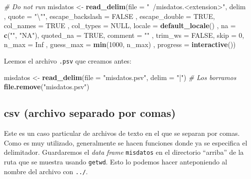 \documentclass[]{article}
\newenvironment{Shaded}{\begin{snugshade}}{\end{snugshade}}
\newcommand{\KeywordTok}[1]{\textcolor[rgb]{0.13,0.29,0.53}{\textbf{#1}}}
\newcommand{\DataTypeTok}[1]{\textcolor[rgb]{0.13,0.29,0.53}{#1}}
\newcommand{\DecValTok}[1]{\textcolor[rgb]{0.00,0.00,0.81}{#1}}
\newcommand{\CharTok}[1]{\textcolor[rgb]{0.31,0.60,0.02}{#1}}
\newcommand{\StringTok}[1]{\textcolor[rgb]{0.31,0.60,0.02}{#1}}
\newcommand{\CommentTok}[1]{\textcolor[rgb]{0.56,0.35,0.01}{\textit{#1}}}
\newcommand{\OtherTok}[1]{\textcolor[rgb]{0.56,0.35,0.01}{#1}}
\newcommand{\NormalTok}[1]{#1}
\begin{document}
\begin{Shaded}
\begin{Highlighting}[]
\CommentTok{# Do not run}
\NormalTok{misdatos <-}\StringTok{ }\KeywordTok{read_delim}\NormalTok{(}\DataTypeTok{file =} \StringTok{"~/misdatos.<extension>"}\NormalTok{, delim}
\NormalTok{                       , }\DataTypeTok{quote =} \StringTok{"}\CharTok{\textbackslash{}"}\StringTok{"}\NormalTok{, }\DataTypeTok{escape_backslash =} \OtherTok{FALSE}
\NormalTok{                       , }\DataTypeTok{escape_double =} \OtherTok{TRUE}\NormalTok{, }\DataTypeTok{col_names =} \OtherTok{TRUE}
\NormalTok{                       , }\DataTypeTok{col_types =} \OtherTok{NULL}\NormalTok{, }\DataTypeTok{locale =} \KeywordTok{default_locale}\NormalTok{()}
\NormalTok{                       , }\DataTypeTok{na =} \KeywordTok{c}\NormalTok{(}\StringTok{""}\NormalTok{, }\StringTok{"NA"}\NormalTok{), }\DataTypeTok{quoted_na =} \OtherTok{TRUE}\NormalTok{, }\DataTypeTok{comment =} \StringTok{""}
\NormalTok{                       , }\DataTypeTok{trim_ws =} \OtherTok{FALSE}\NormalTok{, }\DataTypeTok{skip =} \DecValTok{0}\NormalTok{, }\DataTypeTok{n_max =} \OtherTok{Inf}
\NormalTok{                       , }\DataTypeTok{guess_max =} \KeywordTok{min}\NormalTok{(}\DecValTok{1000}\NormalTok{, n_max)}
\NormalTok{                       , }\DataTypeTok{progress =} \KeywordTok{interactive}\NormalTok{())}
\end{Highlighting}
\end{Shaded}

Leemos el archivo \texttt{.psv} que creamos antes:

\begin{Shaded}
\begin{Highlighting}[]
\NormalTok{misdatos <-}\StringTok{ }\KeywordTok{read_delim}\NormalTok{(}\DataTypeTok{file =} \StringTok{"misdatos.psv"}\NormalTok{, }\DataTypeTok{delim =} \StringTok{"|"}\NormalTok{)}
\CommentTok{# Los borramos}
\KeywordTok{file.remove}\NormalTok{(}\StringTok{"misdatos.psv"}\NormalTok{)}
\end{Highlighting}
\end{Shaded}

\subsection{csv (archivo separado por
comas)}\label{csv-archivo-separado-por-comas}

Este es un caso particular de archivos de texto en el que se separan por
comas. Como es muy utilizado, generalmente se hacen funciones donde ya
se especifica el delimitador. Guardaremos el \emph{data frame}
\texttt{misdatos} en el directorio ``arriba'' de la ruta que se muestra
usando \texttt{getwd}. Esto lo podemos hacer anteponiendo al nombre del
archivo con \texttt{../}.
\end{document}
